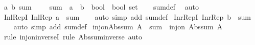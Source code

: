 \begin{isabellebody}
\isanewline
{}\isamarkupfalse%
\ {\isacharparenleft}{\kern0pt}{\isacharprime}{\kern0pt}a{\isacharcomma}{\kern0pt}\ {\isacharprime}{\kern0pt}b{\isacharparenright}{\kern0pt}\ sum\ {\isacharparenleft}{\kern0pt}\ {\isachardoublequoteopen}{\isacharplus}{\kern0pt}{\isachardoublequoteclose}\ {}{}{\isacharparenright}{\kern0pt}\ {\isacharequal}{\kern0pt}\ {\isachardoublequoteopen}sum\ {\isacharcolon}{\kern0pt}{\isacharcolon}{\kern0pt}\ {\isacharparenleft}{\kern0pt}{\isacharprime}{\kern0pt}a\ {\isasymRightarrow}\ {\isacharprime}{\kern0pt}b\ {\isasymRightarrow}\ bool\ {\isasymRightarrow}\ bool{\isacharparenright}{\kern0pt}\ set{\isachardoublequoteclose}\isanewline
%
\isadelimproof
\ \ %
\endisadelimproof
%
\isatagproof
{}\isamarkupfalse%
\ sum{\isacharunderscore}{\kern0pt}def\ \isamarkupfalse%
\ auto%
\endisatagproof
{\isafoldproof}%
%
\isadelimproof
\isanewline
%
\endisadelimproof
\isanewline
{}\isamarkupfalse%
\ Inl{\isacharunderscore}{\kern0pt}RepI{\isacharcolon}{\kern0pt}\ {\isachardoublequoteopen}Inl{\isacharunderscore}{\kern0pt}Rep\ a\ {\isasymin}\ sum{\isachardoublequoteclose}\isanewline
%
\isadelimproof
\ \ %
\endisadelimproof
%
\isatagproof
{}\isamarkupfalse%
\ {\isacharparenleft}{\kern0pt}auto\ simp\ add{\isacharcolon}{\kern0pt}\ sum{\isacharunderscore}{\kern0pt}def{\isacharparenright}{\kern0pt}%
\endisatagproof
{\isafoldproof}%
%
\isadelimproof
\isanewline
%
\endisadelimproof
\isanewline
{}\isamarkupfalse%
\ Inr{\isacharunderscore}{\kern0pt}RepI{\isacharcolon}{\kern0pt}\ {\isachardoublequoteopen}Inr{\isacharunderscore}{\kern0pt}Rep\ b\ {\isasymin}\ sum{\isachardoublequoteclose}\isanewline
%
\isadelimproof
\ \ %
\endisadelimproof
%
\isatagproof
{}\isamarkupfalse%
\ {\isacharparenleft}{\kern0pt}auto\ simp\ add{\isacharcolon}{\kern0pt}\ sum{\isacharunderscore}{\kern0pt}def{\isacharparenright}{\kern0pt}%
\endisatagproof
{\isafoldproof}%
%
\isadelimproof
\isanewline
%
\endisadelimproof
\isanewline
{}\isamarkupfalse%
\ inj{\isacharunderscore}{\kern0pt}on{\isacharunderscore}{\kern0pt}Abs{\isacharunderscore}{\kern0pt}sum{\isacharcolon}{\kern0pt}\ {\isachardoublequoteopen}A\ {\isasymsubseteq}\ sum\ {\isasymLongrightarrow}\ inj{\isacharunderscore}{\kern0pt}on\ Abs{\isacharunderscore}{\kern0pt}sum\ A{\isachardoublequoteclose}\isanewline
%
\isadelimproof
\ \ %
\endisadelimproof
%
\isatagproof
{}\isamarkupfalse%
\ {\isacharparenleft}{\kern0pt}rule\ inj{\isacharunderscore}{\kern0pt}on{\isacharunderscore}{\kern0pt}inverseI{\isacharcomma}{\kern0pt}\ rule\ Abs{\isacharunderscore}{\kern0pt}sum{\isacharunderscore}{\kern0pt}inverse{\isacharparenright}{\kern0pt}\ auto%

\end{isabellebody}
